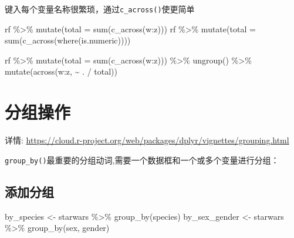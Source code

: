 \documentclass[
]{book}
\newenvironment{Shaded}{\begin{snugshade}}{\end{snugshade}}
\newcommand{\AttributeTok}[1]{\textcolor[rgb]{0.77,0.63,0.00}{#1}}
\newcommand{\FunctionTok}[1]{\textcolor[rgb]{0.00,0.00,0.00}{#1}}
\newcommand{\NormalTok}[1]{#1}
\newcommand{\OtherTok}[1]{\textcolor[rgb]{0.56,0.35,0.01}{#1}}
\newcommand{\SpecialCharTok}[1]{\textcolor[rgb]{0.00,0.00,0.00}{#1}}
\begin{document}
键入每个变量名称很繁琐，通过\texttt{c\_across()}使更简单

\begin{Shaded}
\begin{Highlighting}[]
\NormalTok{rf }\SpecialCharTok{\%\textgreater{}\%} \FunctionTok{mutate}\NormalTok{(}\AttributeTok{total =} \FunctionTok{sum}\NormalTok{(}\FunctionTok{c\_across}\NormalTok{(w}\SpecialCharTok{:}\NormalTok{z)))}
\NormalTok{rf }\SpecialCharTok{\%\textgreater{}\%} \FunctionTok{mutate}\NormalTok{(}\AttributeTok{total =} \FunctionTok{sum}\NormalTok{(}\FunctionTok{c\_across}\NormalTok{(}\FunctionTok{where}\NormalTok{(is.numeric))))}

\NormalTok{rf }\SpecialCharTok{\%\textgreater{}\%} 
  \FunctionTok{mutate}\NormalTok{(}\AttributeTok{total =} \FunctionTok{sum}\NormalTok{(}\FunctionTok{c\_across}\NormalTok{(w}\SpecialCharTok{:}\NormalTok{z))) }\SpecialCharTok{\%\textgreater{}\%} 
  \FunctionTok{ungroup}\NormalTok{() }\SpecialCharTok{\%\textgreater{}\%} 
  \FunctionTok{mutate}\NormalTok{(}\FunctionTok{across}\NormalTok{(w}\SpecialCharTok{:}\NormalTok{z, }\SpecialCharTok{\textasciitilde{}}\NormalTok{ . }\SpecialCharTok{/}\NormalTok{ total))}
\end{Highlighting}
\end{Shaded}

\hypertarget{ux5206ux7ec4ux64cdux4f5c}{%
\section{分组操作}\label{ux5206ux7ec4ux64cdux4f5c}}

详情: \url{https://cloud.r-project.org/web/packages/dplyr/vignettes/grouping.html}

\texttt{group\_by()}最重要的分组动词,需要一个数据框和一个或多个变量进行分组：

\hypertarget{ux6dfbux52a0ux5206ux7ec4}{%
\subsection{添加分组}\label{ux6dfbux52a0ux5206ux7ec4}}

\begin{Shaded}
\begin{Highlighting}[]
\NormalTok{by\_species }\OtherTok{\textless{}{-}}\NormalTok{ starwars }\SpecialCharTok{\%\textgreater{}\%} \FunctionTok{group\_by}\NormalTok{(species)}
\NormalTok{by\_sex\_gender }\OtherTok{\textless{}{-}}\NormalTok{ starwars }\SpecialCharTok{\%\textgreater{}\%} \FunctionTok{group\_by}\NormalTok{(sex, gender)}
\end{Highlighting}
\end{Shaded}
\end{document}

